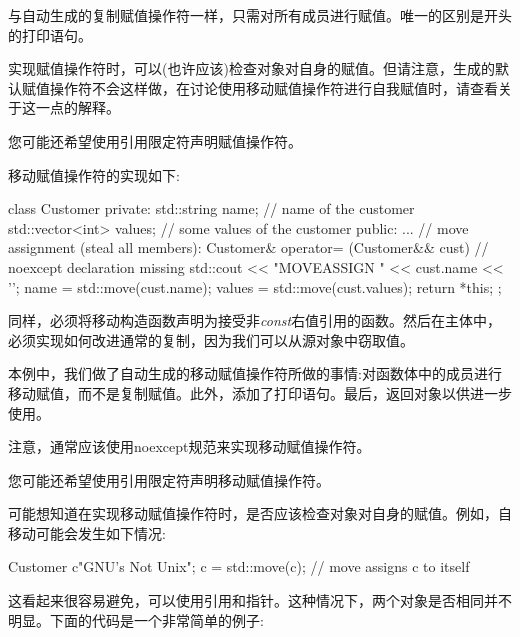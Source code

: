 与自动生成的复制赋值操作符一样，只需对所有成员进行赋值。唯一的区别是开头的打印语句。\par

实现赋值操作符时，可以(也许应该)检查对象对自身的赋值。但请注意，生成的默认赋值操作符不会这样做，在讨论使用移动赋值操作符进行自我赋值时，请查看关于这一点的解释。\par

您可能还希望使用引用限定符声明赋值操作符。\par


移动赋值操作符的实现如下:\par

\begin{codebox}[cpp]
class Customer {
  private:
  std::string name; // name of the customer
  std::vector<int> values; // some values of the customer
  public:
  ...
  // move assignment (steal all members):
  Customer& operator= (Customer&& cust) { // noexcept declaration missing
    std::cout << "MOVEASSIGN " << cust.name << '\n';
    name = std::move(cust.name);
    values = std::move(cust.values);
    return *this;
  }
};
\end{codebox}

同样，必须将移动构造函数声明为接受非\textit{const}右值引用的函数。然后在主体中，必须实现如何改进通常的复制，因为我们可以从源对象中窃取值。\par

本例中，我们做了自动生成的移动赋值操作符所做的事情:对函数体中的成员进行移动赋值，而不是复制赋值。此外，添加了打印语句。最后，返回对象以供进一步使用。\par

注意，通常应该使用noexcept规范来实现移动赋值操作符。\par

您可能还希望使用引用限定符声明移动赋值操作符。\par


可能想知道在实现移动赋值操作符时，是否应该检查对象对自身的赋值。例如，自移动可能会发生如下情况:\par

\begin{codebox}[cpp]
Customer c{"GNU's Not Unix"};
c = std::move(c); // move assigns c to itself
\end{codebox}

这看起来很容易避免，可以使用引用和指针。这种情况下，两个对象是否相同并不明显。下面的代码是一个非常简单的例子:\par


